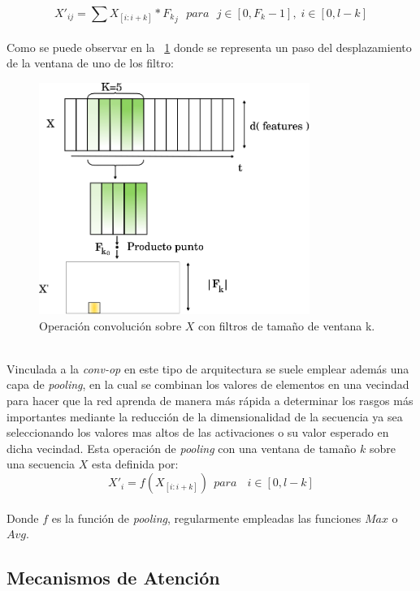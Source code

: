 	\begin{equation}
		X'_{ij} = \sum X_{[i:i+k]} * {F_k}_j ~~~ para ~~~ j \in [0, F_k-1], \;i \in [0, l-k]
	\end{equation}
	\\
	Como se puede observar en la \figurename~\ref{cnn} donde se representa un paso del desplazamiento de la ventana de uno de los filtro:
	\begin{figure}[!thb]
		\begin{center}
			\includegraphics[width=250pt]{images/cnn.eps}
		\end{center}
		\caption[Operación Convolución. CNN]{Operación convolución sobre $X$ con filtros de tamaño de ventana k. }
		\label{cnn}
	\end{figure}
	\\
	Vinculada a la \textit{conv-op} en este tipo de arquitectura se suele emplear además una capa de \textit{pooling}, en la cual se combinan los valores de elementos en una vecindad para hacer que la red aprenda de manera más rápida a determinar los rasgos más importantes mediante la reducción de la dimensionalidad de la secuencia ya sea seleccionando los valores mas altos de las activaciones o su valor esperado en dicha vecindad. Esta operación de \textit{pooling} con una ventana de tamaño $k$  sobre una secuencia $X$ esta definida por:
	\begin{equation}
		X'_i = f(X_{[i:i+k]}) ~~ para ~~~  \;i \in [0, l-k]
	\end{equation}
	\\
	Donde $f$ es la función de \textit{pooling}, regularmente empleadas las funciones $Max$ o $Avg$.
		
\subsection{Mecanismos de Atención}\label{atencion}

